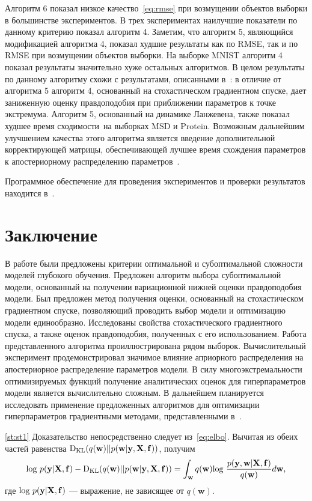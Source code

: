 \documentclass[12pt]{a&t}
\begin{document}
Алгоритм 6 показал низкое качество~\eqref{eq:rmse} при возмущении объектов выборки {в большинстве экспериментов}. В {трех} экспериментах наилучшие показатели по данному критерию показал алгоритм 4. Заметим, что алгоритм 5, являющийся модификацией алгоритма 4, показал худшие результаты как по RMSE, так и по RMSE при возмущении объектов выборки. 
{На выборке MNIST алгоритм 4 показал результаты значительно хуже остальных алгоритмов. В целом результаты по данному алгоритму схожи с результатами, описанными в~\cite{early}: в отличие от алгоритма 5 алгоритм 4, основанный на стохастическом градиентном спуске, дает заниженную оценку правдоподобия при приближении параметров к точке экстремума. } Алгоритм 5, основанный на динамике Ланжевена, также показал худшее время сходимости~{на выборках MSD и Protein}. Возможным дальнейшим улучшением качества этого алгоритма является введение дополнительной корректирующей матрицы, обеспечивающей лучшее время схождения параметров к апостериорному распределению параметров~\cite{langevin}.

Программное обеспечение для проведения экспериментов и проверки результатов  находится в~\cite{my_src}. 






\section{Заключение}

В работе были предложены критерии оптимальной и субоптимальной сложности моделей глубокого обучения. Предложен алгоритм выбора субоптимальной модели, основанный на получении вариационной нижней оценки  правдоподобия модели. Был предложен метод получения оценки, основанный на стохастическом градиентном спуске, позволяющий проводить выбор модели и оптимизацию модели единообразно. Исследованы свойства стохастического градиентного спуска, а также оценок правдоподобия, полученных с его использованием. 
Работа представленного алгоритма проиллюстрирована рядом выборок. 
Вычислительный эксперимент продемонстрировал значимое влияние априорного распределения на апостериорное распределение параметров модели. В силу многоэкстремальности оптимизируемых функций получение аналитических оценок для гиперпараметров модели является вычислительно сложным. В дальнейшем  планируется исследовать применение 
предложенных алгоритмов для оптимизации гиперпараметров градиентными методами, представленными в~\cite{hyper}.

\appendix{}
\begin{proofofstatement}{\ref{st:st1}}
Доказательство непосредственно следует из~\eqref{eq:elbo}. Вычитая из обеих частей равенства $\textnormal{D}_\textnormal{KL}  (q(\mathbf{w})||p(\mathbf{w}|\mathbf{y}, \mathbf{X}, \mathbf{f}))$, получим
\[
\textnormal{log}~p(\mathbf{y}|\mathbf{X},\mathbf{f}) - \textnormal{D}_\textnormal{KL}  (q(\mathbf{w})||p(\mathbf{w}|\mathbf{y}, \mathbf{X}, \mathbf{f}))  = \int_{\mathbf{w}} q(\mathbf{w})\textnormal{log}~\frac{p(\mathbf{y},\mathbf{w}|\mathbf{X},\mathbf{f})}{q(\mathbf{w})}d\mathbf{w},
\]
где $\textnormal{log}~p(\mathbf{y}|\mathbf{X},\mathbf{f})$ --- выражение, не зависящее от $q(\mathbf{w})$.
\end{proofofstatement}
\end{document}
